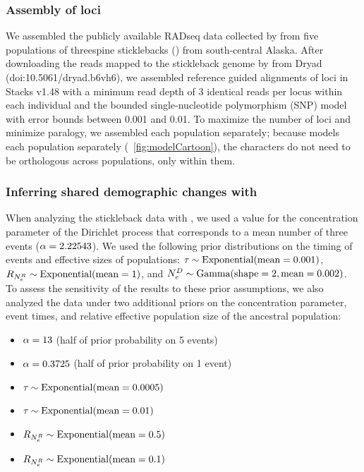 \subsubsection{Assembly of loci}
We assembled the publicly available RADseq data collected by
\citet{Hohenlohe2010}
from five populations of threespine sticklebacks ()
from south-central Alaska.
After downloading the reads mapped to the stickleback genome by
\citet{Hohenlohe2010}
from Dryad
(doi:10.5061/dryad.b6vh6),
we assembled reference guided alignments of loci in Stacks v1.48
\citet{Catchen2013} with a minimum read depth of 3 identical reads per locus
within each individual and the bounded single-nucleotide polymorphism (SNP)
model with error bounds between
0.001 and 0.01.
To maximize the number of loci and minimize paralogy, we assembled each
population separately;
because \ecoevolity models each population separately
(\fig{}~\ref{fig:modelCartoon}),
the characters do not need to be orthologous across populations, only within
them.

\subsubsection{Inferring shared demographic changes with \ecoevolity}

When analyzing the stickleback data with \ecoevolity, we used a value for the
concentration parameter of the Dirichlet process that corresponds to a mean
number of three events
($\concentration = 2.22543$).
We used the following prior distributions on the timing of events and effective
sizes of populations:
$\etime \sim \dexponential{0.001}$,
$\rootrelativepopsize \sim \dexponential{1}$,
and
$\epopsize[\descendantpopindex{}] \sim \dgamma{2}{0.002}$.
To assess the sensitivity of the results to these prior assumptions,
we also analyzed the data under two additional priors on
the concentration parameter, event times, and relative
effective population size of the ancestral population:
\begin{itemize}
    \item $\concentration = 13$ (half of prior probability on 5 events)
    \item $\concentration = 0.3725$ (half of prior probability on 1 event)
    \item $\etime \sim \dexponential{0.0005}$
    \item $\etime \sim \dexponential{0.01}$
    \item $\rootrelativepopsize \sim \dexponential{0.5}$
    \item $\rootrelativepopsize \sim \dexponential{0.1}$
\end{itemize}

